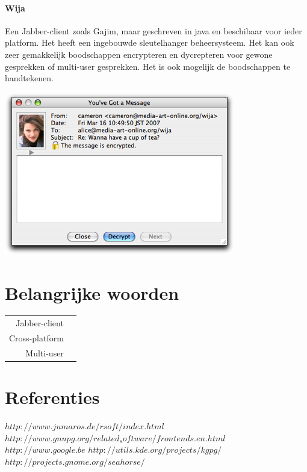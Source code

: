 \documentclass[12pt]{article}
\begin{document}
\paragraph{Wija}
Een Jabber-client zoals Gajim, maar geschreven in java en beschibaar voor ieder platform.
Het heeft een ingebouwde sleutelhanger beheersysteem. Het kan ook zeer gemakkelijk boodschappen encrypteren en dycrepteren voor gewone gesprekken of multi-user gesprekken.
Het is ook mogelijk de boodschappen te handtekenen.
\begin{center}
\includegraphics[scale=0.7]{Pictures/wija}
\end{center}

\newpage
\section{Belangrijke woorden}\label{Belangrijke woorden}
\begin{tabular}{r|l}
Jabber-client		&	\\
Cross-platform		&	\\
Multi-user			&	\\
\end{tabular}

\newpage
\section{Referenties}\label{Referenties}
$http://www.jumaros.de/rsoft/index.html$ \\
$http://www.gnupg.org/related_software/frontends.en.html$ \\
$http://www.google.be$
$http://utils.kde.org/projects/kgpg/$
$http://projects.gnome.org/seahorse/$



\end{document}
